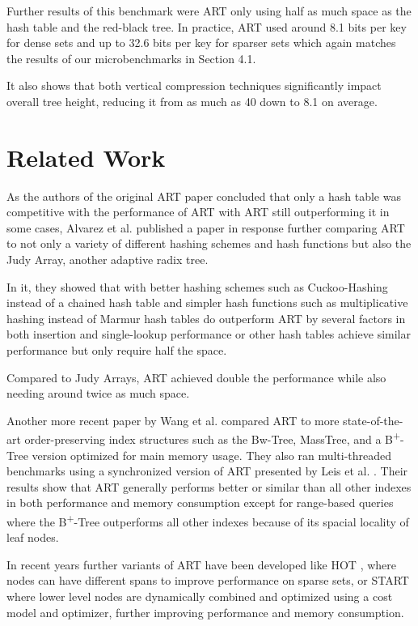\documentclass[acmtog, nonacm]{acmart}
\begin{document}
Further results of this benchmark were ART only using half as much space as the hash table and the red-black tree. 
In practice, ART used around 8.1 bits per key for dense sets and up to 32.6 bits per key for sparser sets which 
again matches the results of our microbenchmarks in Section 4.1.

It also shows that both vertical compression techniques significantly impact overall tree height, 
reducing it from as much as 40 down to 8.1 on average.

\section{Related Work}
As the authors of the original ART paper concluded that only a hash table was competitive with the performance of ART \cite{6544812} 
with ART still outperforming it in some cases, Alvarez et al. published a paper \cite{7113370} in response further comparing ART to
not only a variety of different hashing schemes and hash functions but also the Judy Array, another adaptive radix tree.

In it, they showed that with better hashing schemes such as Cuckoo-Hashing \cite{PAGH2004122} instead of a chained hash table
and simpler hash functions such as multiplicative hashing instead of Marmur hash tables do outperform ART by several factors in
both insertion and single-lookup performance or other hash tables achieve similar performance but only require half the space.

Compared to Judy Arrays, ART achieved double the performance while also needing around twice as much space.

Another more recent paper by Wang et al. compared ART to more state-of-the-art order-preserving index structures such 
as the Bw-Tree, MassTree, and a B\textsuperscript{+}-Tree version optimized for main memory usage. They also ran multi-threaded
benchmarks using a synchronized version of ART presented by Leis et al. \cite{10.1145/2933349.2933352}. Their results show
that ART generally performs better or similar than all other indexes in both performance and memory consumption except for
range-based queries where the B\textsuperscript{+}-Tree outperforms all other indexes because of its spacial locality of 
leaf nodes.

In recent years further variants of ART have been developed like HOT \cite{10.1145/3183713.3196896}, where nodes can have different spans to improve performance
on sparse sets, or START \cite{9094133} where lower level nodes are dynamically combined and optimized using
a cost model and optimizer, further improving performance and memory consumption.
\end{document}
